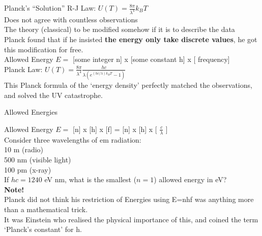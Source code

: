 \begin{frame}{Planck's ``Solution''}
\small
R-J Law: $U(T) = \frac{8\pi}{\lambda^4} k_B T$\\[2ex]
Does not agree with countless observations\\[2ex]
The theory (classical) to be modified somehow if it is to describe the data\\[2ex]
Planck found that if he insisted \textbf{the energy only take discrete values}, he got this modification for free.\\[2ex]

Allowed Energy $E = $ [some integer n] x [some constant h] x [ frequency]\\[1ex]

Planck Law: $U(T) = \frac{ 8\pi }{\lambda^4} \frac{hc}{ \lambda ( e^{(hc/\lambda)k_B T} -1)}$ \\[2ex]


This Planck formula of the `energy density' perfectly matched the observations, and solved the UV catastrophe.\\[1ex]


\end{frame}


\begin{frame}{Allowed Energies}
\small

Allowed Energy $E = $ [n] x [h] x [f] =  [n] x [h] x [ $\frac{c}{\lambda}$ ]\\[1ex]

Consider three wavelengths of em radiation:\\[1ex]

10 m (radio)\\ %

500 nm (visible light)\\ %

100 pm (x-ray)\\ [1ex] %

If $hc = 1240 $ eV nm, what is the smallest ($n=1$) allowed energy in eV?\\[2ex]

\textbf{Note!}\\[1ex]
Planck did not think his restriction of Energies using E=nhf was anything more than a mathematical trick.\\[1ex]
It was Einstein who realised the physical importance of this, and coined the term `Planck's constant' for h.\\[1ex]
\end{frame}


 
